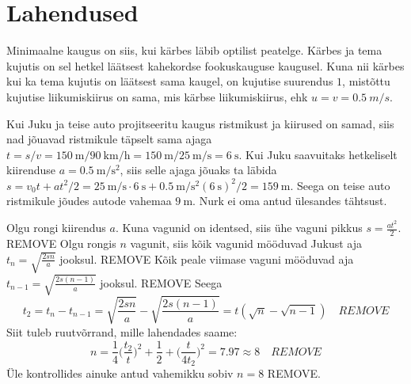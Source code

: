 \documentclass[10pt]{article}
\newcommand{\pp}[1]{REMOVE}
\begin{document}
\probend
\bigskip
\newpage\section{Lahendused}
        \toggleSolution
        

\solu
Minimaalne kaugus on siis, kui kärbes läbib optilist peatelge. Kärbes ja tema kujutis on sel hetkel läätsest kahekordse fookuskauguse kaugusel. Kuna nii kärbes kui ka tema kujutis on läätsest sama kaugel, on kujutise suurendus $1$, mistõttu kujutise liikumiskiirus on sama, mis kärbse liikumiskiirus, ehk $u = v = \SI{0,5}{m/s}$.
\probend
\bigskip


\solu
Kui Juku ja teise auto projitseeritu kaugus ristmikust ja kiirused on samad, siis nad jõuavad ristmikule täpselt sama ajaga $t = s/v = \SI{150}{\meter} / \SI{90}{\kilo\meter\per\hour} = \SI{150}{\meter} / \SI{25}{\meter\per\second} = \SI{6}{\second}$. Kui Juku saavuitaks hetkeliselt kiirenduse $a = \SI{0.5}{\meter\per\second\squared}$, siis selle ajaga jõuaks ta läbida $s = v_0 t + a t^2/2 = \SI{25}{\meter\per\second} \cdot \SI{6}{\second} + \SI{0.5}{\meter\per\second\squared} (\SI{6}{\second})^2 / 2 = \SI{159}{\meter}$. Seega on teise auto ristmikule jõudes autode vahemaa $\SI{9}{\meter}$. Nurk ei oma antud ülesandes tähtsust.
\probend
\bigskip

\setAuthor{}

\solu
Olgu rongi kiirendus $a$. Kuna vagunid on identsed, siis ühe vaguni pikkus $s=\frac{at^2}{2}$. \pp{1} Olgu rongis $n$ vagunit, siis kõik vagunid mööduvad Jukust 
aja $t_n=\sqrt{\frac{2sn}{a}}$ jooksul. \pp{1} Kõik peale viimase vaguni mööduvad aja $t_{n-1}=\sqrt{\frac{2s(n-1)}{a}}$ jooksul. \pp{1} Seega 
$$t_2=t_n-t_{n-1}=\sqrt{\frac{2sn}{a}}-\sqrt{\frac{2s(n-1)}{a}}=t(\sqrt{n}-\sqrt{n-1}) \quad \pp{1}$$
Siit tuleb ruutvõrrand, mille lahendades saame:
$$n = \frac{1}{4}\bigg(\frac{t_2}{t}\bigg)^2 + \frac{1}{2} + \bigg(\frac{t}{4t_2}\bigg)^2 = 7.97 \approx 8 \quad \pp{1}$$
Üle kontrollides ainuke antud vahemikku sobiv $n=8$ \pp{1}.
\probend
\bigskip

\setAuthor{}
\end{document}
